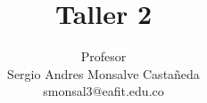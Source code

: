 \documentclass[11pt,letterpaper]{article}
\title{Taller 2}
\author{
	Profesor\\
	Sergio Andres Monsalve Castañeda\\
	smonsal3@eafit.edu.co
}
\begin{document}
 
\pagestyle{fancyplain}
\fancyhf{}
\headheight=20pt %
\renewcommand{\headrulewidth}{0pt} %


\fancyfoot[c]{\thepage}

\maketitle

\begin{minipage}{3cm}
\end{minipage}





%
%
\end{document}
